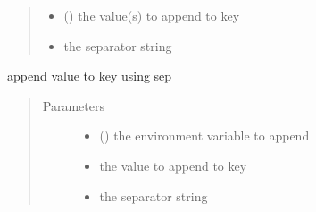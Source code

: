 \documentclass[a4paper,10pt,english]{sphinxmanual}
\begin{document}
\begin{fulllineitems}
\begin{fulllineitems}
\begin{quote}
\begin{description}
\begin{itemize}
\item {} 
 () \textendash{} the value(s) to append to key

\item {} 
 \textendash{} the separator string

\end{itemize}

\end{description}\end{quote}

\end{fulllineitems}


\begin{fulllineitems}
\label{\detokenize{commands/apidoc/src:src.fileEnviron.LauncherFileEnviron.append_value}}
append value to key using sep
\begin{quote}\begin{description}
\item[{Parameters}] \leavevmode\begin{itemize}
\item {} 
 () \textendash{} the environment variable to append

\item {} 
 \textendash{} the value to append to key

\item {} 
 \textendash{} the separator string

\end{itemize}

\end{description}\end{quote}

\end{fulllineitems}


\begin{fulllineitems}
\label{\detokenize{commands/apidoc/src:src.fileEnviron.LauncherFileEnviron.change_to_launcher}}
\end{fulllineitems}


\end{fulllineitems}
\end{document}
